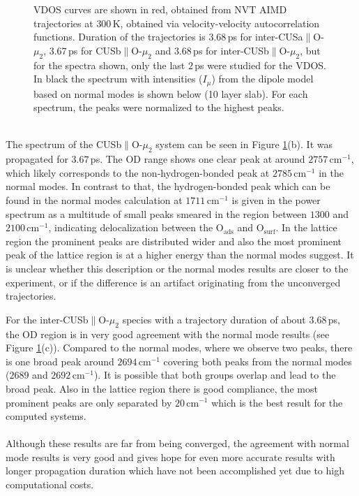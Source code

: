 \documentclass[11pt,DIV=13,BCOR=5mm,a4paper,headinclude]{scrbook}
\begin{document}
\begin{figure}[!h]
             \caption{VDOS curves are shown in red, obtained from NVT AIMD trajectories at $300\,$K, obtained via velocity-velocity autocorrelation functions.
Duration of the trajectories is $3.68\,$ps for inter-CUSa$\parallel$O-$\mu_2$, $3.67\,$ps for CUSb$\parallel$O-$\mu_2$ and $3.68\,$ps for inter-CUSb$\parallel$O-$\mu_2$, but for the spectra shown, only the last $2\,$ps were studied for the VDOS.
In black the spectrum with intensities ($I_\mu$) from the dipole model based on normal modes is shown below (10 layer slab).
For each spectrum, the peaks were normalized to the highest peaks.}
            \label{abb:velvel_ads_spec}
\end{figure}
\\

The spectrum of the CUSb$\parallel$O-$\mu_2$ system can be seen in Figure \ref{abb:velvel_ads_spec}(b).
It was propagated for $3.67\,$ps.
The OD range shows one clear peak at around $2757\,$cm$^{-1}$, which likely corresponds to the non-hydrogen-bonded peak at $2785\,$cm$^{-1}$ in the normal modes.
In contrast to that, the hydrogen-bonded peak which can be found in the normal modes calculation at $1711\,$cm$^{-1}$ is given in the power spectrum as a multitude of small peaks smeared in the region between $1300$ and $2100\,$cm$^{-1}$, indicating delocalization between the O$_\textrm{ads}$ and O$_\textrm{surf}$.
In the lattice region the prominent peaks are distributed wider and also the most prominent peak of the lattice region is at a higher energy than the normal modes suggest.
It is unclear whether this description or the normal modes results are closer to the experiment, or if the difference is an artifact originating from the unconverged trajectories.


For the inter-CUSb$\parallel$O-$\mu_2$ species with a trajectory duration of about $3.68\,$ps, the OD region is in very good agreement with the normal mode results (see Figure \ref{abb:velvel_ads_spec}(c)).
Compared to the normal modes, where we observe two peaks, there is one broad peak around $2694\,$cm$^{-1}$ covering both peaks from the normal modes ($2689$ and $2692\,$cm$^{-1}$).
It is possible that both groups overlap and lead to the broad peak.
Also in the lattice region there is good compliance, the most prominent peaks are only separated by $20\,$cm$^{-1}$ which is the best result for the computed systems.
\\
\\

Although these results are far from being converged, the agreement with normal mode results is very good and gives hope for even more accurate results with longer propagation duration which have not been accomplished yet due to high computational costs.
\end{document}
